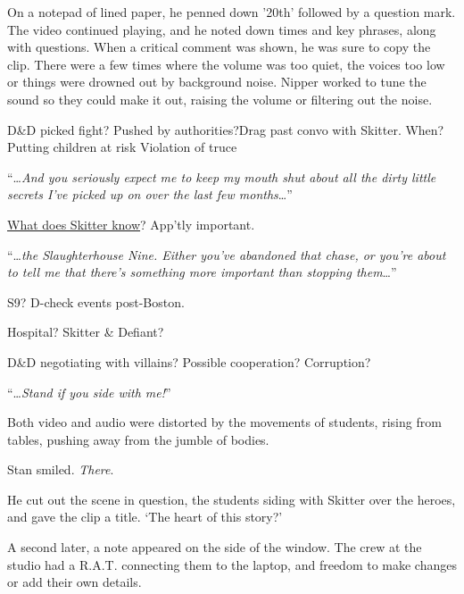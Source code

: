 On a notepad of lined paper, he penned down '20th' followed by a question mark.  The video continued playing, and he noted down times and key phrases, along with questions.  When a critical comment was shown, he was sure to copy the clip.  There were a few times where the volume was too quiet, the voices too low or things were drowned out by background noise.  Nipper worked to tune the sound so they could make it out, raising the volume or filtering out the noise.



D&D picked fight?  Pushed by authorities?Drag past convo with Skitter.  When?
Putting children at risk
Violation of truce



``\ldots\emph{And you seriously expect me to keep my mouth shut about all the dirty little secrets I've picked up on over the last few months}\ldots''



\underline{What does Skitter know}?  App'tly important.



``\ldots\emph{the Slaughterhouse Nine.  Either you've abandoned that chase, or you're about to tell me that there's something more important than stopping them}\ldots''



S9?  D-check events post-Boston.



Hospital?  Skitter & Defiant?



D&D negotiating with villains?  Possible cooperation?  Corruption?



``\ldots\emph{Stand if you side with me!}''



Both video and audio were distorted by the movements of students, rising from tables, pushing away from the jumble of bodies.



Stan smiled.  \emph{There}.



He cut out the scene in question, the students siding with Skitter over the heroes, and gave the clip a title.  `The heart of this story?'



A second later, a note appeared on the side of the window.  The crew at the studio had a R.A.T. connecting them to the laptop, and freedom to make changes or add their own details.



